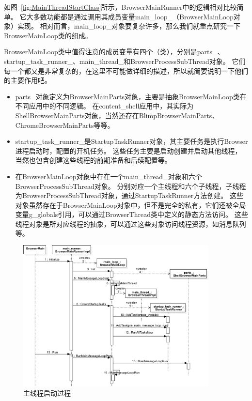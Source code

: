 如图~\ref{fig:MainThreadStartClass}所示，BrowserMainRunner中的逻辑相对比较简单。
它大多数功能都是通过调用其成员变量main\_loop\_（BrowserMainLoop对象）实现。
相对而言，main\_loop\_对象要复杂许多，那么我们就重点研究一下BrowserMainLoop类的组成。

BrowserMainLoop类中值得注意的成员变量有四个（类），分别是parts\_、startup\_task\_runner\_、main\_thread\_和BrowserProcessSubThread对象。
它们每一个都又是非常复杂的，在这里不可能做详细的描述，所以就简要说明一下他们的主要作用吧。
\begin{itemize}
  \item parts\_对象定义为BrowserMainParts对象，主要是抽象BrowserMainLoop类在不同应用中的不同逻辑。
  在content\_shell应用中，其实际为ShellBrowserMainParts对象，当然还存在BlimpBrowserMainParts、ChromeBrowserMainParts等等。
  \item startup\_task\_runner\_是StartupTaskRunner对象，其主要任务是执行Browser进程启动时，配置的开机任务。
  这些任务主要是启动创建并启动其他线程，当然也包含创建这些线程的前期准备和后续配置等。
  \item 在BrowserMainLoop对象中存在一个main\_thread\_对象和六个BrowserProcessSubThread对象。
  分别对应一个主线程和六个子线程，子线程为BrowserProcessSubThread对象，通过StartupTaskRunner方法创建。
  这些对象虽然存在于BrowserMainLoop对象中，但不是完全的私有，它们还被全局变量g\_globals引用，可以通过BrowserThread类中定义的静态方法访问。
  这些线程对象是所对应线程的抽象，可以通过这些对象访问线程资源，如消息队列等。
\end{itemize}

\begin{figure}[H] 
  \centering 
  \includegraphics[width=0.90\textwidth]{image/process_study/MainThreadStartSuquence.pdf} 
  \caption{主线程启动过程} \label{fig:MainThreadStartSuquence} 
\end{figure}

